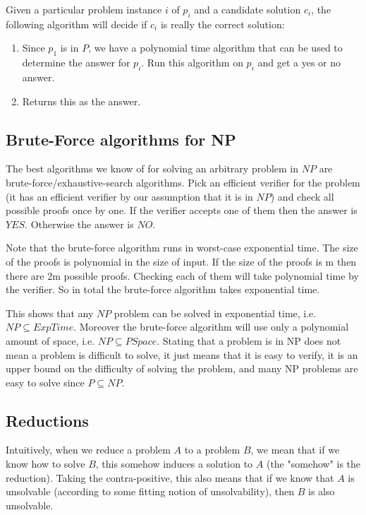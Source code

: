 Given a particular problem instance $i$ of $p_i$ and a candidate solution $c_i$, the following algorithm will decide if $c_i$ is really the correct solution:
\begin{enumerate}
    \item Since $p_1$ is in $P$, we have a polynomial time algorithm that can be used to determine the answer for $p_i$. Run this algorithm on $p_i$ and get a yes or no answer.
    \item Returns this as the answer.
\end{enumerate}

\subsection{Brute-Force algorithms for NP}
The best algorithms we know of for solving an arbitrary problem in $NP$ are brute-force/exhaustive-search algorithms. Pick an efficient verifier for the problem (it has an efficient verifier by our assumption that it is in $NP$) and check all possible proofs once by one. If the verifier accepts one of them then the answer is $YES$. Otherwise the answer is $NO$.

Note that the brute-force algorithm runs in worst-case exponential time. The size of the proofs is polynomial in the size of input. If the size of the proofs is m then there are 2m possible proofs. Checking each of them will take polynomial time by the verifier. So in total the brute-force algorithm takes exponential time.

This shows that any $NP$ problem can be solved in exponential time, i.e. $NP \subseteq ExpTime$. Moreover the brute-force algorithm will use only a polynomial amount of space, i.e. $NP \subseteq PSpace$. Stating that a problem is in NP does not mean a problem is difficult to solve, it just means that it is easy to verify, it is an upper bound on the difficulty of solving the problem, and many NP problems are easy to solve since $P \subseteq NP$.

\subsection{Reductions}
Intuitively, when we reduce a problem $A$ to a problem $B$, we mean that if we know how to solve $B$, this somehow induces a solution to $A$ (the "somehow" is the reduction). Taking the contra-positive, this also means that if we know that $A$ is unsolvable (according to some fitting notion of unsolvability), then $B$ is also unsolvable.

